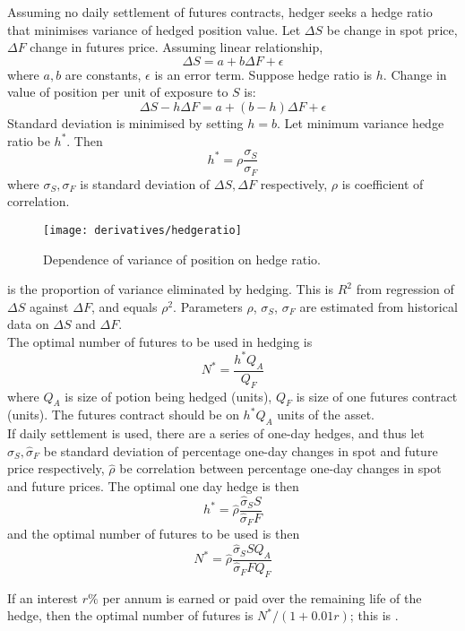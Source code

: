 Assuming no daily settlement of futures contracts, hedger seeks a hedge ratio that minimises variance of hedged position value. Let $\Delta S$ be change in spot price, $\Delta F$ change in futures price. Assuming linear relationship,
\begin{equation}
\Delta S = a + b \Delta F + \epsilon	 \nonumber
\end{equation}
where $a,b$ are constants, $\epsilon$ is an error term. Suppose hedge ratio is $h$. Change in value of position per unit of exposure to $S$ is:
\begin{equation}
\Delta S - h \Delta F = a + (b-h) \Delta F + \epsilon \nonumber
\end{equation}
Standard deviation is minimised by setting $h=b$. Let minimum variance hedge ratio be $h^*$. Then
\begin{equation}
h^* = \rho \frac{\sigma_S}{\sigma_F} \nonumber
\end{equation}
where $\sigma_S, \sigma_F$ is standard deviation of $\Delta S, \Delta F$ respectively, $\rho$ is coefficient of correlation.

\begin{figure}[H]
\centering
\texttt{[image: derivatives/hedgeratio]}
\caption{Dependence of variance of position on hedge ratio.}
\end{figure}

 is the proportion of variance eliminated by hedging. This is $R^2$ from regression of $\Delta S$ against $\Delta F$, and equals $\rho^2$. Parameters $\rho$, $\sigma_S$, $\sigma_F$ are estimated from historical data on $\Delta S$ and $\Delta F$.\\

The optimal number of futures to be used in hedging is
\begin{equation}
N^* = \frac{h^* Q_A}{Q_F} \nonumber
\end{equation}
where $Q_A$ is size of potion being hedged (units), $Q_F$ is size of one futures contract (units). The futures contract should be on $h^* Q_A$ units of the asset.\\

If daily settlement is used, there are a series of one-day hedges, and thus let $\hat{\sigma}_S, \hat{\sigma}_F$ be standard deviation of percentage one-day changes in spot and future price respectively, $\hat{\rho}$ be correlation between percentage one-day changes in spot and future prices. The optimal one day hedge is then
\begin{equation}
h^* = \hat{\rho}\frac{\hat{\sigma}_S S}{\hat{\sigma}_F F} \nonumber
\end{equation} 
and the optimal number of futures to be used is then
\begin{equation}
N^* = \hat{\rho}\frac{\hat{\sigma}_S S Q_A}{\hat{\sigma}_F F Q_F} \nonumber
\end{equation}

If an interest $r\%$ per annum is earned or paid over the remaining life of the hedge, then the optimal number of futures is $N^* / (1+0.01r)$; this is .



